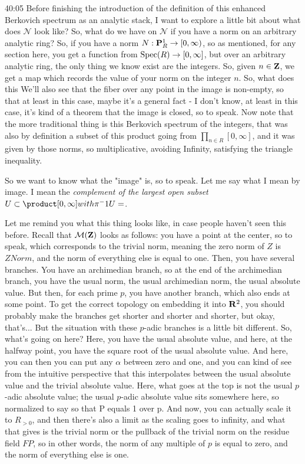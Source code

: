 \begin{example}
\begin{unfinished}{40:05}
Before finishing the introduction of the definition of this enhanced Berkovich spectrum as an analytic stack, I want to explore a little bit about what does $\mathcal{N}$ look like? So, what do we have on $\mathcal{N}$ if you have a norm on an arbitrary analytic ring? So, if you have a norm $N: \P_R^1 \to [0, \infty)$, so as mentioned, for any section here, you get a function from $\Spec(R) \to [0, \infty]$, but over an arbitrary analytic ring, the only thing we know exist are the integers. 
So, given $n \in \Z$, we get a map which records the value of your norm on the integer $n$. So, what does this
We'll also see that the fiber over any point in the image is non-empty, so that at least in this case, maybe it's a general fact - I don't know, at least in this case, it's kind of a theorem that the image is closed, so to speak. Now note that the more traditional thing is this Berkovich spectrum of the integers, that was also by definition a subset of this product going from $\prod_{n \in R} [0, \infty]$, and it was given by those norms, so multiplicative, avoiding Infinity, satisfying the triangle inequality.

So we want to know what the "image" is, so to speak. Let me say what I mean by image. I mean the \emph{complement of the largest open subset $U \subset \product[0,\infty] with \pi^-1 U = \empty$}.

Let me remind you what this thing looks like, in case people haven't seen this before. Recall that $\M(\Z)$ looks as follows: you have a point at the center, so to speak, which corresponds to the trivial norm, meaning the zero norm of $Z$ is $Z Norm$, and the norm of everything else is equal to one. 
Then, you have several branches. You have an archimedian branch, so at the end of the archimedian branch, you have the usual norm, the usual archimedian norm, the usual absolute value. But then, for each prime $p$, you have another branch, which also ends at some point. To get the correct topology on embedding it into $\R^2$, you should probably make the branches get shorter and shorter and shorter, but okay, that's...
But the situation with these $p$-adic branches is a little bit different. So, what's going on here? Here, you have the usual absolute value, and here, at the halfway point, you have the square root of the usual absolute value. And here, you can then you can put any $\alpha$ between zero and one, and you can kind of see from the intuitive perspective that this interpolates between the usual absolute value and the trivial absolute value. 
Here, what goes at the top is not the usual $p$-adic absolute value; the usual $p$-adic absolute value sits somewhere here, so normalized to say so that P equals 1 over p. And now, you can actually scale it to $R_{>0}$, and then there's also a limit as the scaling goes to infinity, and what that gives is the trivial norm or the pullback of the trivial norm on the residue field $FP$, so in other words, the norm of any multiple of $p$ is equal to zero, and the norm of everything else is one.


\end{unfinished}
\end{example}
